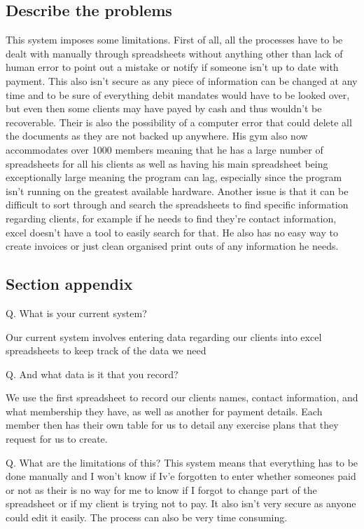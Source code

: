 \subsection{Describe the problems}

This system imposes some limitations. First of all, all the processes have to be dealt with manually through spreadsheets without anything other than lack of human error to point out a mistake or notify if someone isn't up to date with payment. This also isn't secure as any piece of information can be changed at any time and to be sure of everything debit mandates would have to be looked over, but even then some clients may have payed by cash and thus wouldn't be recoverable. Their is also the possibility of a computer error that could delete all the documents as they are not backed up anywhere. His gym also now accommodates over 1000 members meaning that he has a large number of spreadsheets for all his clients as well as having his main spreadsheet being exceptionally large meaning the program can lag, especially since the program isn't running on the greatest available hardware. Another issue is that it can be difficult to sort through and search the spreadsheets to find specific information regarding clients, for example if he needs to find they're contact information, excel doesn't have a tool to easily search for that. He also has no easy way to create invoices or just clean organised print outs of any information he needs.

\subsection{Section appendix}

Q. What is your current system?

Our current system involves entering data regarding our clients into excel spreadsheets to keep track of the data we need

Q. And what data is it that you record?

We use the first spreadsheet to record our clients names, contact information, and what membership they have, as well as another for payment details. Each member then has their own table for us to detail any exercise plans that they request for us to create. 

Q. What are the limitations of this?
This system means that everything has to be done manually and I won't know if Iv'e forgotten to enter whether someones paid or not as their is no way for me to know if I forgot to change part of the spreadsheet or if my client is trying not to pay. It also isn't very secure as anyone could edit it easily. The process can also be very time consuming.

